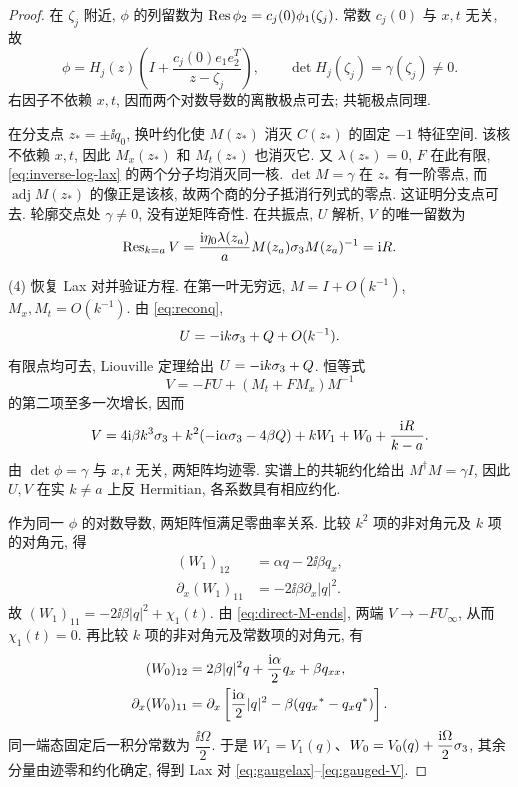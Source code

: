\begin{proof}
在 $\zeta_j$ 附近, $\phi$ 的列留数为 $\operatorname{Res}\phi_2=c_j(0)\phi_1(\zeta_j)$. 常数 $c_j(0)$ 与 $x,t$ 无关, 故
\begin{equation*}
\phi=H_j(z)\left(I+\dfrac{c_j(0)e_1e_2^T}{z-\zeta_j}\right),\qquad
\det H_j(\zeta_j)=\gamma(\zeta_j)\ne0.
\end{equation*}
右因子不依赖 $x,t$, 因而两个对数导数的离散极点可去; 共轭极点同理.

在分支点 $z_*=\pm\ii q_0$, 换叶约化使 $M(z_*)$ 消灭 $C(z_*)$ 的固定 $-1$ 特征空间. 该核不依赖 $x,t$, 因此 $M_x(z_*)$ 和 $M_t(z_*)$ 也消灭它. 又 $\lambda(z_*)=0$, $F$ 在此有限, \eqref{eq:inverse-log-lax} 的两个分子均消灭同一核. $\det M=\gamma$ 在 $z_*$ 有一阶零点, 而 $\operatorname{adj}M(z_*)$ 的像正是该核, 故两个商的分子抵消行列式的零点. 这证明分支点可去. 轮廓交点处 $\gamma\ne0$, 没有逆矩阵奇性. 在共振点, $U$ 解析, $V$ 的唯一留数为
\begin{equation*}
\operatorname{Res}_{k=a}V=\dfrac{\mathrm{i}\eta_0\lambda(z_a)}{a}M(z_a)\sigma_3 M(z_a)^{-1}=\mathrm{i} R.
\end{equation*}

(4) 恢复 Lax 对并验证方程. 在第一叶无穷远, $M=I+O(k^{-1})$, $M_x,M_t=O(k^{-1})$. 由 \eqref{eq:reconq},
\begin{equation*}
U=-\mathrm{i} k\sigma_3+Q+O(k^{-1}).
\end{equation*}
有限点均可去, Liouville 定理给出 $U=-\mathrm{i} k\sigma_3+Q$. 恒等式
\begin{equation*}
V=-FU+(M_t+FM_x)M^{-1}
\end{equation*}
的第二项至多一次增长, 因而
\begin{equation}\label{eq:inverse-V-form}
V=4\mathrm{i}\beta k^3\sigma_3+k^2(-\mathrm{i}\alpha\sigma_3-4\beta Q)
+kW_1+W_0+\dfrac{\mathrm{i} R}{k-a}.
\end{equation}
由 $\det\phi=\gamma$ 与 $x,t$ 无关, 两矩阵均迹零. 实谱上的共轭约化给出 $M^\dagger M=\gamma I$, 因此 $U,V$ 在实 $k\ne a$ 上反 Hermitian, 各系数具有相应约化.

作为同一 $\phi$ 的对数导数, 两矩阵恒满足零曲率关系. 比较 $k^2$ 项的非对角元及 $k$ 项的对角元, 得
\begin{equation*}
\begin{aligned}
(W_1)_{12}&=\alpha q-2\ii\beta q_x,\\
\partial_x(W_1)_{11}&=-2\ii\beta\partial_x|q|^2.
\end{aligned}
\end{equation*}
故 $(W_1)_{11}=-2\ii\beta|q|^2+\chi_1(t)$. 由 \eqref{eq:direct-M-ends}, 两端 $V\to-FU_\infty$, 从而 $\chi_1(t)=0$. 再比较 $k$ 项的非对角元及常数项的对角元, 有
\begin{equation*}
\begin{aligned}
(W_0)_{12}&=2\beta|q|^2q+\dfrac{\mathrm{i}\alpha}{2}q_x+\beta q_{xx},\\
\partial_x(W_0)_{11}&=\partial_x\left[\dfrac{\mathrm{i}\alpha}{2}|q|^2-\beta(q{q_x}^{*}-q_x{q}^{*})\right].
\end{aligned}
\end{equation*}
同一端态固定后一积分常数为 $\dfrac{\ii\Omega}{2}$. 于是 $W_1=V_1(q)$、$W_0=V_0(q)+\dfrac{\mathrm{i}\Omega}{2}\sigma_3$, 其余分量由迹零和约化确定, 得到 Lax 对 \eqref{eq:gaugelax}--\eqref{eq:gauged-V}.


\end{proof}
